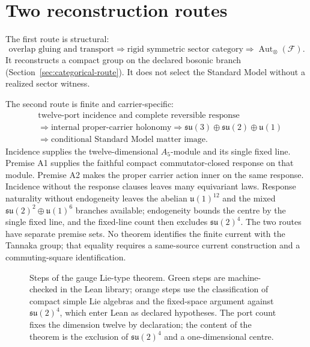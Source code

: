 \documentclass[11pt]{article}
\begin{document}
\tableofcontents

\section{Two reconstruction routes}
\label{sec:two-routes}

The first route is structural:
\[
\text{overlap gluing and transport}
\Longrightarrow
\text{rigid symmetric sector category}
\Longrightarrow
\operatorname{Aut}_{\otimes}(\mathcal F).
\]
It reconstructs a compact group on the declared bosonic branch
(Section~\ref{sec:categorical-route}). It does not select the Standard Model
without a realized sector witness.

The second route is finite and carrier-specific:
\[
\begin{split}
&\text{twelve-port incidence and complete reversible response}\\
&\Longrightarrow\text{internal proper-carrier holonomy}
\Longrightarrow
\mathfrak{su}(3)\oplus\mathfrak{su}(2)\oplus\mathfrak u(1)\\
&\Longrightarrow
\text{conditional Standard Model matter image}.
\end{split}
\]
Incidence supplies the twelve-dimensional \(A_5\)-module and its single
fixed line. Premise A1 supplies the faithful compact commutator-closed
response on that module. Premise A2 makes the proper carrier action inner on
the same response. Incidence without the response clauses leaves many
equivariant laws. Response naturality without endogeneity leaves the abelian
\(\mathfrak u(1)^{12}\) and the mixed
\(\mathfrak{su}(2)^{2}\oplus\mathfrak u(1)^{6}\) branches available;
endogeneity bounds the centre by the single fixed line, and the fixed-line
count then excludes \(\mathfrak{su}(2)^{4}\). The two routes have separate
premise sets. No theorem identifies the finite current with the Tannaka
group; that equality requires a same-source current construction and a
commuting-square identification.

\begin{figure}[!htb]
\centering

\caption{Steps of the gauge Lie-type theorem. Green steps are machine-checked in the Lean library; orange steps use the classification of compact simple Lie algebras and the fixed-space argument against $\mathfrak{su}(2)^4$, which enter Lean as declared hypotheses. The port count fixes the dimension twelve by declaration; the content of the theorem is the exclusion of $\mathfrak{su}(2)^4$ and a one-dimensional centre.}
\label{fig:gauge-lie-type}
\end{figure}
\end{document}
